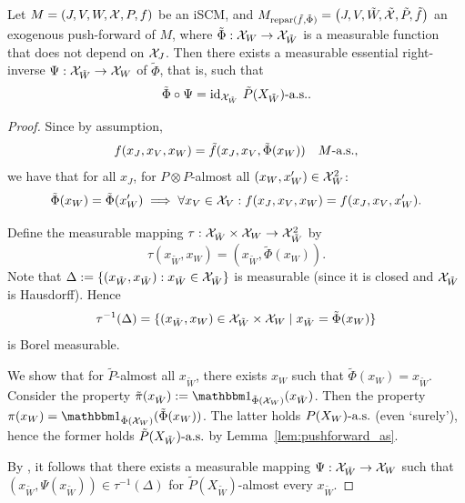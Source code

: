 \begin{Lem}
  Let $M = \left ( J, V, W, \mathcal{X}, P, f \right )$ be an iSCM, and $M_{\mathrm{repar}({\tilde{f}},{\tilde{\Phi}})} = \left ( J, V, \tilde{W}, \tilde{\mathcal{X}}, \tilde{P}, \tilde{f} \right )$ an exogenous push-forward of $M$, where $\tilde\Phi : \mathcal{X}_W \to \mathcal{X}_{\tilde{W}}$ is a measurable function that does not depend on $\mathcal{X}_J$.
  Then there exists a measurable essential right-inverse $\Psi : \mathcal{X}_{\tilde{W}} \to \mathcal{X}_W$ of $\tilde\Phi$, that is, such that
  $$\tilde{\Phi} \circ \Psi = \mathrm{id}_{\mathcal{X}_{\tilde{W}}}\ \tilde P(X_{\tilde{W}})\text{-a.s.}.$$
\end{Lem}
\begin{proof}
Since by assumption,
  $$f(x_J,x_V,x_W) = \tilde{f}(x_J,x_V,\tilde{\Phi}(x_W)) \quad M\text{-a.s.},$$
we have that for all $x_J$, for $P \otimes P$-almost all $(x_{W},x_{W}') \in \mathcal{X}_W^2$:
  $$\tilde{\Phi}(x_W) = \tilde{\Phi}(x_W') \implies \forall x_V \in \mathcal{X}_V: f(x_J,x_V,x_W) = f(x_J,x_V,x_W').$$

Define the measurable mapping $\tau : \mathcal{X}_{\tilde{W}} \times \mathcal{X}_W \to \mathcal{X}_{\tilde{W}}^2$ by
  $$\tau(x_{\tilde{W}},x_W) = (x_{\tilde{W}},\tilde\Phi(x_W)).$$
Note that $\Delta:=\{(x_{\tilde{W}},x_{\tilde{W}}) : x_{\tilde{W}} \in \mathcal{X}_{\tilde{W}}\}$ is measurable (since it is closed and $\mathcal{X}_{\tilde{W}}$ is Hausdorff).
Hence
  $$\tau^{-1}(\Delta) = \{ (x_{\tilde{W}},x_W) \in \mathcal{X}_{\tilde{W}} \times \mathcal{X}_W \mid x_{\tilde{W}} = \tilde\Phi(x_W) \}$$
is Borel measurable.

We show that for $\tilde{P}$-almost all $x_{\tilde{W}}$, there exists $x_W$ such that $\tilde\Phi(x_W) = x_{\tilde{W}}$.
Consider the property $\tilde\pi(x_{\tilde W}) := \ind_{\tilde\Phi(\CX_W)}(x_{\tilde{W}})$.
Then the property $\pi(x_W) = \ind_{\tilde\Phi(\CX_W)}(\tilde\Phi(x_W))$.
The latter holds $P(X_W)\text{-a.s.}$ (even `surely'), hence the former holds $\tilde{P}(X_{\tilde{W}})\text{-a.s.}$ by Lemma~\ref{lem:pushforward_as}.

By \cite[Theorem F.8]{BFPM21}, it follows that there exists a measurable mapping $\Psi : \mathcal{X}_{\tilde{W}} \to \mathcal{X}_W$ such that $(x_{\tilde{W}},\Psi(x_{\tilde{W}})) \in \tau^{-1}(\Delta)$ for $\tilde P(X_{\tilde{W}})$-almost every $x_{\tilde{W}}$.
\end{proof}

